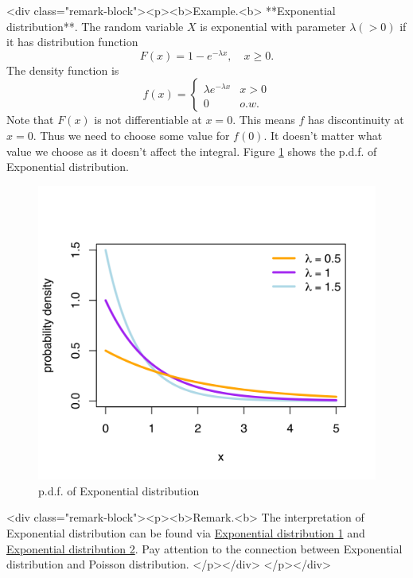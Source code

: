 <div class="remark-block"><p><b>Example.<b> 
**Exponential distribution**. The random variable $X$ is exponential with parameter $\lambda(> 0)$ if it has distribution function 
$$\begin{equation}
    F(x) = 1 - e^{-\lambda x}, \quad x \geq 0.
\end{equation}$$
The density function is
$$\begin{equation}
    f(x) = \begin{cases} \lambda e^{-\lambda x} & x > 0 \\ 0 & o.w.
    \end{cases}
\end{equation}$$
Note that $F(x)$ is not differentiable at $x=0$. This means $f$ has discontinuity at $x=0$. Thus we need to choose some value for $f(0)$. It doesn't matter what value we choose as it doesn't affect the integral. Figure \ref{fig:exponential} shows the p.d.f. of Exponential distribution.
\begin{figure}[!htb]
    \centering
    \includegraphics[scale=0.25]{plots/exponential.png}
    \caption{p.d.f. of Exponential distribution}
    \label{fig:exponential}
\end{figure}

<div class="remark-block"><p><b>Remark.<b> 
The interpretation of Exponential distribution can be found via \href{https://www.probabilitycourse.com/chapter4/4_2_2_exponential.php}{Exponential distribution 1} and \href{https://www.statlect.com/probability-distributions/exponential-distribution}{Exponential distribution 2}. Pay attention to the connection between Exponential distribution and Poisson distribution.
</p></div>
</p></div>

